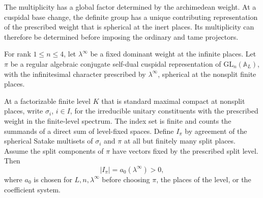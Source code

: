 The multiplicity has a global factor determined by the archimedean weight. At a cuspidal base change, the definite group has a unique contributing representation of the prescribed weight that is spherical at the inert places. Its multiplicity can therefore be determined before imposing the ordinary and tame projectors.

\begin{proposition}
\label{prop:ordinary-stable-constituent-count}
For rank \(1\le n\le4\), let
\(\lambda^\infty\) be a fixed dominant weight at the
infinite places. Let \(\pi\) be a regular algebraic
conjugate self-dual cuspidal representation of
\(\mathrm{GL}_n(\mathbb A_L)\), with the infinitesimal
character prescribed by \(\lambda^\infty\), spherical at
the nonsplit finite places.

At a factorizable finite
level \(K\) that is standard maximal compact at nonsplit
places, write \(\sigma_i\), \(i\in I\), for the
irreducible unitary constituents with the prescribed
weight in the finite-level spectrum. The index set is
finite and counts the summands of a direct sum of
level-fixed spaces. Define \(I_\pi\) by agreement of the
spherical Satake multisets of \(\sigma_i\) and \(\pi\) at
all but finitely many split places. Assume the split
components of \(\pi\) have vectors fixed by the
prescribed split level. Then
\[
                   |I_\pi|=a_0(\lambda^\infty)>0,
\]
where \(a_0\) is chosen for \(L,n,\lambda^\infty\)
before choosing \(\pi\), the places of the level, or
the coefficient system.

\end{proposition}

